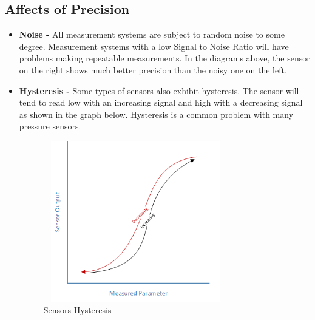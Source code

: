 \documentclass[a4paper,12pt]{report}
\begin{document}
\subsection{Affects of Precision}
\begin{itemize}
 \item \textbf{Noise -} All measurement systems are subject to random noise to some degree.  Measurement systems with a low Signal to Noise Ratio will have problems making repeatable measurements.  In the diagrams above, the sensor on the right shows much better precision than the noisy one on the left.\cite{Adafruit}
 \item \textbf{Hysteresis -} Some types of sensors also exhibit hysteresis.  The sensor will tend to read low with an increasing signal and high with a decreasing signal as shown in the graph below.  Hysteresis is a common problem with many pressure sensors.\cite{Adafruit}

 \begin{figure}[h!]
 \centering
  \includegraphics[width=8cm, height=7cm]{figures/sensors_Hysteresis.png}
  \caption{Sensors Hysteresis }
 \end{figure}
\end{itemize}
\end{document}
